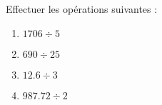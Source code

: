 \begin{exercice*}
   Effectuer les opérations suivantes :
   \begin{multicols}{2}
   \begin{enumerate}
      \item $\num{1706}\div5$
      \item $690\div25$
      \item $\num{12,6}\div3$
      \item $\num{987,72}\div2$
   \end{enumerate}
   \end{multicols}
\end{exercice*}
